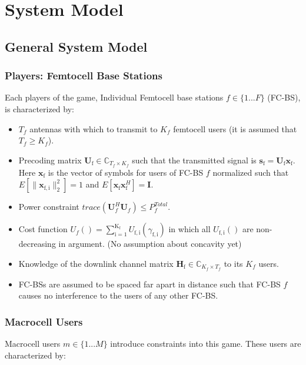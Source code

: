 \documentclass[12pt,a4paper]{report}
\begin{document}
\chapter{System Model}

\section{General System Model}\label{genmodel}

\subsection{Players: Femtocell Base Stations}


Each players of the game, Individual Femtocell base stations $f \in \{1 ... F\}$ (FC-BS), is characterized by:
\begin{itemize}
\item 
$T_f$ antennas with which to transmit to $K_f$ femtocell users (it is assumed that $T_f \geq K_f$).
\\
\item 
	Precoding matrix $\mathbf{U}_{\mathrm{f}} \in \mathbb{C}_{T_f \times K_f}$ such that the transmitted 		
	signal is $\mathbf{s}_{\mathrm{f}
	}= \mathbf{U_{\mathrm{f}}}\mathbf{x_{\mathrm{f}}}$. Here $\mathbf{x_{\mathrm{f}}}$ is the 		
	vector of symbols for users of FC-BS $f$ normalized such that $E[\|\mathbf{x}_{\mathrm{f,i}}
	\|_2^2]=1$ and $E[\mathbf{x}_{\mathrm{f}}\mathbf{x}_{\mathrm{f}}^H]=\mathbf{I}$.
\\
\item 
	Power constraint $trace(\mathbf{U}_f^H\mathbf{U}_f) \leq P^{Total}_{f} $.

\item 
	Cost function $U_f() =
	\sum_{\mathrm{i=1}}^{\mathrm{K_f}}
    	 U_{\mathrm{f,i}}(\gamma_{\mathrm{f,i}}) $
    	in which all $U_{\mathrm{f,i}}()$ are non-decreasing in argument. (No assumption about concavity yet)

\item 
	Knowledge of the downlink channel matrix $\mathbf{H_\mathrm{f}} \in \mathbb{C}_{K_f \times T_f} $ to its $K_f$ users.
\\
\item
	 FC-BSs are assumed to be spaced far apart in distance such that FC-BS $f$ 
	 causes no interference to the users of any other FC-BS.
\end{itemize}

\subsection{Macrocell Users}
Macrocell users $m \in \{1 ... M\}$ introduce constraints into this game. These users are characterized by:
\end{document}
